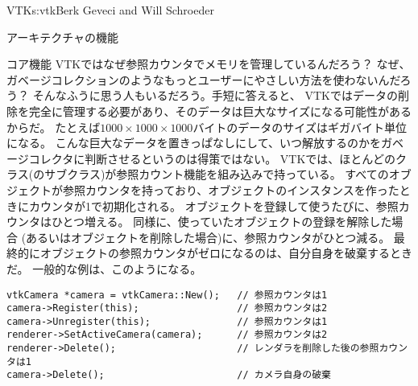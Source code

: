 \begin{aosachapter}{VTK}{s:vtk}{Berk Geveci and Will Schroeder}
\begin{aosasect1}{アーキテクチャの機能}
\begin{aosasect2}{コア機能}
VTKではなぜ参照カウンタでメモリを管理しているんだろう？
なぜ、ガベージコレクションのようなもっとユーザーにやさしい方法を使わないんだろう？
そんなふうに思う人もいるだろう。手短に答えると、
VTKではデータの削除を完全に管理する必要があり、そのデータは巨大なサイズになる可能性があるからだ。
たとえば$1000{\times}1000{\times}1000$バイトのデータのサイズはギガバイト単位になる。
こんな巨大なデータを置きっぱなしにして、いつ解放するのかをガベージコレクタに判断させるというのは得策ではない。
VTKでは、ほとんどのクラス(のサブクラス)が参照カウント機能を組み込みで持っている。
すべてのオブジェクトが参照カウンタを持っており、オブジェクトのインスタンスを作ったときにカウンタが1で初期化される。
オブジェクトを登録して使うたびに、参照カウンタはひとつ増える。
同様に、使っていたオブジェクトの登録を解除した場合
(あるいはオブジェクトを削除した場合)に、参照カウンタがひとつ減る。
最終的にオブジェクトの参照カウンタがゼロになるのは、自分自身を破棄するときだ。
一般的な例は、このようになる。

\begin{verbatim}
vtkCamera *camera = vtkCamera::New();   // 参照カウンタは1
camera->Register(this);                 // 参照カウンタは2
camera->Unregister(this);               // 参照カウンタは1
renderer->SetActiveCamera(camera);      // 参照カウンタは2
renderer->Delete();                     // レンダラを削除した後の参照カウンタは1
camera->Delete();                       // カメラ自身の破棄
\end{verbatim}


\end{aosasect2}
\end{aosasect1}
\end{aosachapter}
